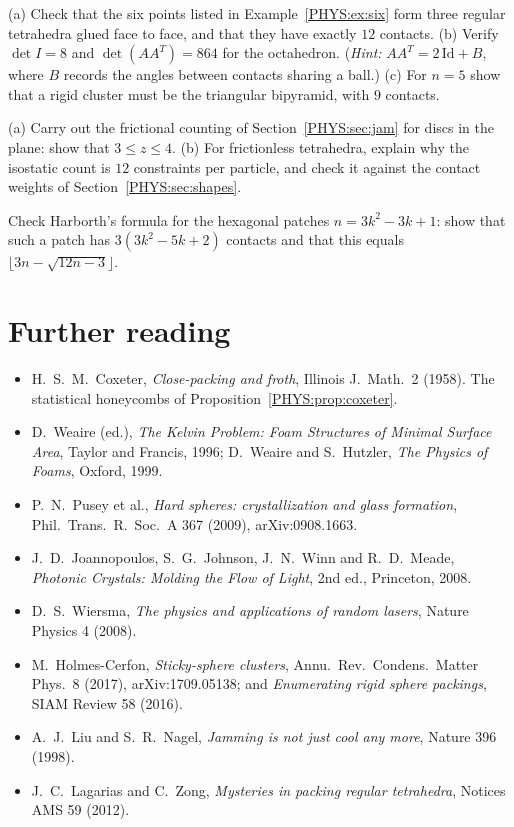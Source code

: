 \begin{exercise}
(a) Check that the six points listed in Example~\ref{PHYS:ex:six} form three regular tetrahedra glued face to face,
and that they have exactly $12$ contacts. (b) Verify $\det I=8$ and $\det(AA^T)=864$ for the octahedron.
(\emph{Hint:} $AA^T=2\,\mathrm{Id}+B$, where $B$ records the angles between contacts sharing a ball.) (c) For $n=5$
show that a rigid cluster must be the triangular bipyramid, with $9$ contacts.
\end{exercise}

\begin{exercise}
(a) Carry out the frictional counting of Section~\ref{PHYS:sec:jam} for discs in the plane: show that
$3\le z\le4$. (b) For frictionless tetrahedra, explain why the
isostatic count is $12$ constraints per particle, and check it against the contact weights of
Section~\ref{PHYS:sec:shapes}.
\end{exercise}

\begin{exercise}
Check Harborth's formula for the hexagonal patches $n=3k^2-3k+1$: show that such a patch has $3(3k^2-5k+2)$
contacts and that this equals $\lfloor3n-\sqrt{12n-3}\rfloor$.
\end{exercise}

\section*{Further reading}
\begin{itemize}[nosep]
\item H.~S.~M.~Coxeter, \emph{Close-packing and froth}, Illinois J.\ Math.\ 2 (1958). The statistical honeycombs of
  Proposition~\ref{PHYS:prop:coxeter}.
\item D.~Weaire (ed.), \emph{The Kelvin Problem: Foam Structures of Minimal Surface Area}, Taylor and Francis, 1996;
  D.~Weaire and S.~Hutzler, \emph{The Physics of Foams}, Oxford, 1999.
\item P.~N.~Pusey et al., \emph{Hard spheres: crystallization and glass formation}, Phil.\ Trans.\ R.\ Soc.\ A 367
  (2009), arXiv:0908.1663.
\item J.~D.~Joannopoulos, S.~G.~Johnson, J.~N.~Winn and R.~D.~Meade, \emph{Photonic Crystals: Molding the Flow of
  Light}, 2nd ed., Princeton, 2008.
\item D.~S.~Wiersma, \emph{The physics and applications of random lasers}, Nature Physics 4 (2008).
\item M.~Holmes-Cerfon, \emph{Sticky-sphere clusters}, Annu.\ Rev.\ Condens.\ Matter Phys.\ 8 (2017),
  arXiv:1709.05138; and \emph{Enumerating rigid sphere packings}, SIAM Review 58 (2016).
\item A.~J.~Liu and S.~R.~Nagel, \emph{Jamming is not just cool any more}, Nature 396 (1998).
\item J.~C.~Lagarias and C.~Zong, \emph{Mysteries in packing regular tetrahedra}, Notices AMS 59 (2012).
\end{itemize}
